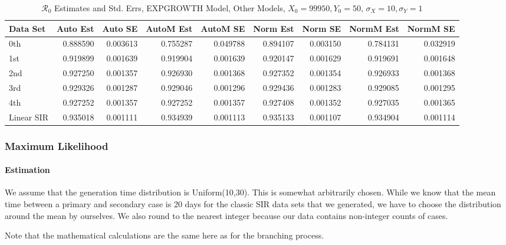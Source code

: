 \documentclass[12pt]{article}
\newcommand{\rr}{\ensuremath{\mathcal{R}_0}}
\begin{document}
\begin{table}[H]
	
	\caption{$\rr$ Estimates and Std. Errs, EXPGROWTH Model,
		Other Models, $X_0 = 99950, Y_0 = 50$, 
		$\sigma_X = 10, \sigma_Y = 1$}
	\begin{footnotesize}
		\hskip -1cm
		\begin{tabular}{l|r|r|r|r|r|r|r|r}
			\hline
			Data Set & Auto Est & Auto SE & AutoM Est & AutoM SE & Norm Est & Norm SE & NormM Est & NormM SE\\
			\hline
			0th & 0.888590 & 0.003613 & 0.755287 & 0.049788 & 0.894107 & 0.003150 & 0.784131 & 0.032919\\
			\hline
			1st & 0.919899 & 0.001639 & 0.919904 & 0.001639 & 0.920147 & 0.001629 & 0.919691 & 0.001648\\
			\hline
			2nd & 0.927250 & 0.001357 & 0.926930 & 0.001368 & 0.927352 & 0.001354 & 0.926933 & 0.001368\\
			\hline
			3rd & 0.929326 & 0.001287 & 0.929046 & 0.001296 & 0.929436 & 0.001283 & 0.929085 & 0.001295\\
			\hline
			4th & 0.927252 & 0.001357 & 0.927252 & 0.001357 & 0.927408 & 0.001352 & 0.927035 & 0.001365\\
			\hline
			Linear SIR & 0.935018 & 0.001111 & 0.934939 & 0.001113 & 0.935133 & 0.001107 & 0.934904 & 0.001114\\
			\hline
		\end{tabular}
	\end{footnotesize}
\end{table}

\subsubsection{Maximum Likelihood}

\paragraph{Estimation}

We assume that the generation time distribution is Uniform(10,30). This is somewhat arbitrarily chosen. While we know that the mean time between a primary and secondary case is 20 days for the classic SIR data sets that we generated, we have to choose the distribution around the mean by ourselves. We also round to the nearest integer because our data contains non-integer counts of cases.

Note that the mathematical calculations are the same here as for the branching process.
\end{document}
